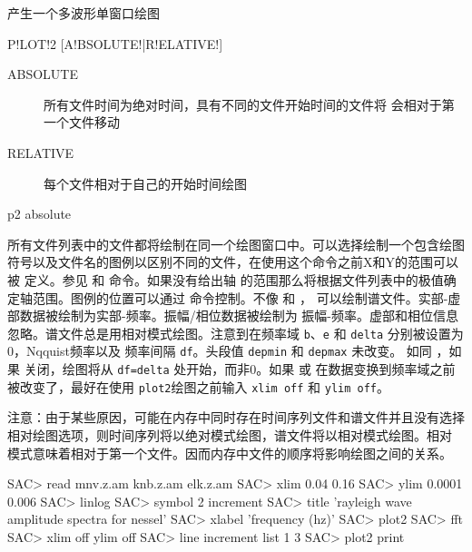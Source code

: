 \label{cmd:plot2}

产生一个多波形单窗口绘图

\begin{SACSTX}
P!LOT!2 [A!BSOLUTE!|R!ELATIVE!]
\end{SACSTX}

\begin{description}
\item [ABSOLUTE] 所有文件时间为绝对时间，具有不同的文件开始时间的文件将
    会相对于第一个文件移动
\item [RELATIVE] 每个文件相对于自己的开始时间绘图
\end{description}

\begin{SACDFT}
p2 absolute
\end{SACDFT}

所有文件列表中的文件都将绘制在同一个绘图窗口中。可以选择绘制一个包含绘图
符号以及文件名的图例以区别不同的文件，在使用这个命令之前X和Y的范围可以被
定义。参见  和  命令。如果没有给出轴
的范围那么将根据文件列表中的极值确定轴范围。图例的位置可以通过 
命令控制。不像  和 ，
可以绘制谱文件。实部-虚部数据被绘制为实部-频率。振幅/相位数据被绘制为
振幅-频率。虚部和相位信息忽略。谱文件总是用相对模式绘图。注意到在频率域
\texttt{b}、\texttt{e} 和 \texttt{delta} 分别被设置为0，Nqquist频率以及
频率间隔 \texttt{df}。头段值 \texttt{depmin} 和 \texttt{depmax} 未改变。
如同 ，如果  关闭，绘图将从
\texttt{df=delta} 处开始，而非0。如果  或 
在数据变换到频率域之前被改变了，最好在使用 \texttt{plot2}绘图之前输入
\texttt{xlim off} 和 \texttt{ylim off}。

注意：由于某些原因，可能在内存中同时存在时间序列文件和谱文件并且没有选择
相对绘图选项，则时间序列将以绝对模式绘图，谱文件将以相对模式绘图。相对
模式意味着相对于第一个文件。因而内存中文件的顺序将影响绘图之间的关系。

\begin{SACCode}
SAC> read mnv.z.am knb.z.am elk.z.am
SAC> xlim 0.04 0.16
SAC> ylim 0.0001 0.006
SAC> linlog
SAC> symbol 2 increment
SAC> title 'rayleigh wave amplitude spectra for nessel'
SAC> xlabel 'frequency (hz)'
SAC> plot2
SAC> fft
SAC> xlim off ylim off
SAC> line increment list 1 3
SAC> plot2 print
\end{SACCode}
